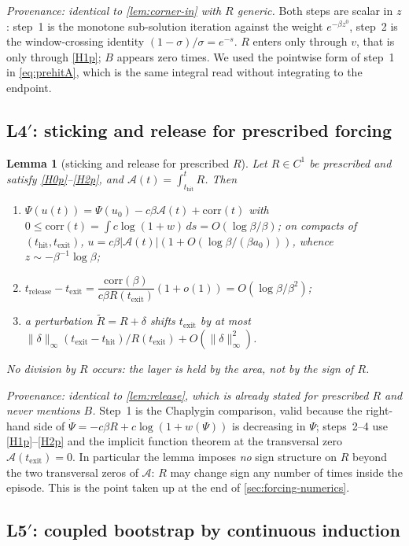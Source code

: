 \documentclass[11pt]{article}
\newtheorem{lemma}[lemma]{Lemma}
\theoremstyle{definition}
\theoremstyle{remark}
\newcommand{\thit}{t_{\mathrm{hit}}}
\newcommand{\texit}{t_{\mathrm{exit}}}
\newcommand{\trel}{t_{\mathrm{release}}}
\newcommand{\Ar}{\mathcal{A}}                      %
\begin{document}
\noindent\emph{Provenance: identical to \cref{lem:corner-in} with $R$ generic.}
Both steps are scalar in $z$: step~1 is the monotone sub-solution iteration
against the weight $e^{-\beta z^0}$, step~2 is the window-crossing identity
$(1-\sigma)/\sigma=e^{-s}$. $R$ enters only through $v$, that is only through
\eqref{H1p}; $B$ appears zero times. We used the pointwise form of step~1 in
\eqref{eq:prehitA}, which is the same integral read without integrating to the
endpoint.

\subsection{L4$'$: sticking and release for prescribed forcing}\label{app:F4}

\begin{lemma}[sticking and release for prescribed $R$]\label{lem:releaseF}
Let $R\in C^1$ be prescribed and satisfy \textup{\eqref{H0p}--\eqref{H2p}}, and
$\Ar(t)=\int_{\thit}^tR$. Then
\begin{enumerate}
\item[(i)] $\Psi(u(t))=\Psi(u_0)-c\beta\Ar(t)+\mathrm{corr}(t)$ with
$0\le\mathrm{corr}(t)=\int c\log(1+w)\,ds=O(\log\beta/\beta)$; on compacts of
$(\thit,\texit)$, $u=c\beta|\Ar(t)|(1+O(\log\beta/(\beta a_0)))$, whence
$z\sim-\beta^{-1}\log\beta$;
\item[(ii)] $\trel-\texit=\dfrac{\mathrm{corr}(\beta)}{c\beta R(\texit)}(1+o(1))
=O(\log\beta/\beta^2)$;
\item[(iii)] a perturbation $\tilde R=R+\delta$ shifts $\texit$ by at most
$\|\delta\|_\infty(\texit-\thit)/R(\texit)+O(\|\delta\|_\infty^2)$.
\end{enumerate}
No division by $R$ occurs: the layer is held by the area, not by the sign of
$R$.
\end{lemma}

\noindent\emph{Provenance: identical to \cref{lem:release}, which is already
stated for prescribed $R$ and never mentions $B$.} Step~1 is the Chaplygin
comparison, valid because the right-hand side of
$\dot\Psi=-c\beta R+c\log(1+w(\Psi))$ is decreasing in $\Psi$; steps~2--4 use
\eqref{H1p}--\eqref{H2p} and the implicit function theorem at the transversal zero
$\Ar(\texit)=0$. In particular the lemma imposes \emph{no} sign structure on $R$
beyond the two transversal zeros of $\Ar$: $R$ may change sign any number of
times inside the episode. This is the point taken up at the end of
\cref{sec:forcing-numerics}.

\subsection{L5$'$: coupled bootstrap by continuous induction}\label{app:F5}
\end{document}
